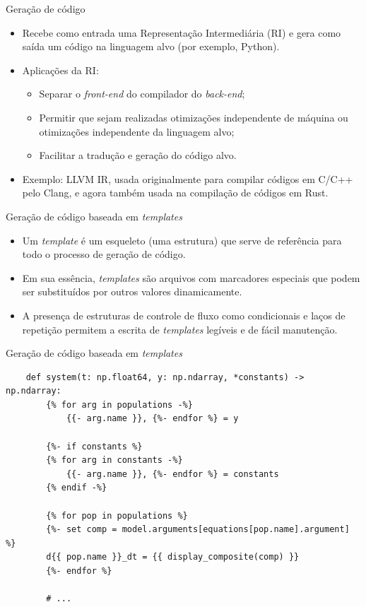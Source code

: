 \begin{frame}{Geração de código}
    \begin{itemize}
        \item Recebe como entrada uma Representação Intermediária (RI) e gera como saída um código na linguagem alvo (por exemplo, Python).
        \item Aplicações da RI: 
        \begin{itemize}
            \item Separar o \textit{front-end} do compilador do \textit{back-end};
            \item Permitir que sejam realizadas otimizações independente de máquina ou otimizações independente da linguagem alvo; 
            \item Facilitar a tradução e geração do código alvo.
        \end{itemize}
        \item Exemplo: LLVM IR, usada originalmente para compilar códigos em C/C++ pelo Clang, e agora também usada na compilação de códigos em Rust.
    \end{itemize}    
\end{frame}

\begin{frame}{Geração de código baseada em \textit{templates}}
    \begin{itemize}
        \item Um \textit{template} é um esqueleto (uma estrutura) que serve de referência para todo o processo de geração de código.
        \item Em sua essência, \textit{templates} são arquivos com marcadores especiais que podem ser substituídos por outros valores dinamicamente.
        \item A presença de estruturas de controle de fluxo como condicionais e laços de repetição permitem a escrita de \textit{templates} legíveis e de fácil manutenção.
    \end{itemize}
\end{frame}

\begin{frame}[fragile]{Geração de código baseada em \textit{templates}}
    \begin{verbatim}
    def system(t: np.float64, y: np.ndarray, *constants) -> np.ndarray:
        {% for arg in populations -%}
            {{- arg.name }}, {%- endfor %} = y

        {%- if constants %}
        {% for arg in constants -%}
            {{- arg.name }}, {%- endfor %} = constants
        {% endif -%}

        {% for pop in populations %}
        {%- set comp = model.arguments[equations[pop.name].argument] %}
        d{{ pop.name }}_dt = {{ display_composite(comp) }}
        {%- endfor %}

        # ...
    \end{verbatim}
\end{frame}

